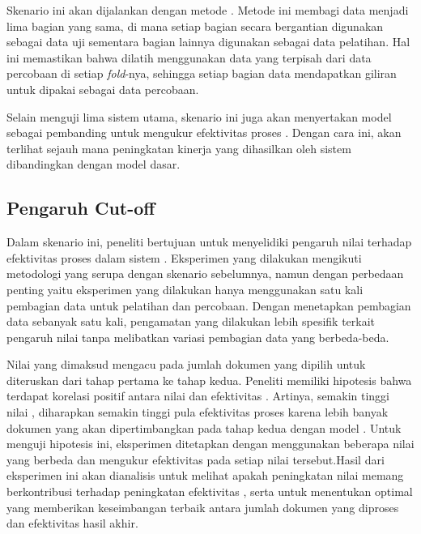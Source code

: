 Skenario ini akan dijalankan dengan metode \fcv{}. Metode ini membagi data menjadi lima bagian yang sama, di mana setiap bagian secara bergantian digunakan sebagai data uji sementara bagian lainnya digunakan sebagai data pelatihan. Hal ini memastikan bahwa \reranker{} dilatih menggunakan data yang terpisah dari data percobaan \retrieval{} di setiap \textit{fold}-nya, sehingga setiap bagian data mendapatkan giliran untuk dipakai sebagai data percobaan.

Selain menguji lima sistem utama, skenario ini juga akan menyertakan model \base{} \retriever{} sebagai pembanding untuk mengukur efektivitas proses \retrieval{}. Dengan cara ini, akan terlihat sejauh mana peningkatan kinerja yang dihasilkan oleh sistem \cascaded{} \ir{} dibandingkan dengan model dasar.





\subsection{Pengaruh Cut-off}
\label{subbab:5::Pengaruh Cut-off}
Dalam skenario ini, peneliti bertujuan untuk menyelidiki pengaruh nilai \cutoff{} terhadap efektivitas proses \retrieval{} dalam sistem \cascaded{} \ir{}. Eksperimen yang dilakukan mengikuti metodologi yang serupa dengan skenario sebelumnya, namun dengan perbedaan penting yaitu eksperimen yang dilakukan hanya menggunakan satu kali pembagian data untuk pelatihan dan percobaan. Dengan menetapkan pembagian data sebanyak satu kali, pengamatan yang dilakukan lebih spesifik terkait pengaruh nilai \cutoff{} tanpa melibatkan variasi pembagian data yang berbeda-beda.

Nilai \cutoff{} yang dimaksud mengacu pada jumlah dokumen yang dipilih untuk diteruskan dari tahap \ranking{} pertama ke tahap kedua. Peneliti memiliki hipotesis bahwa terdapat korelasi positif antara nilai \cutoff{} dan efektivitas \retrieval{}. Artinya, semakin tinggi nilai \cutoff{}, diharapkan semakin tinggi pula efektivitas proses \retrieval{} karena lebih banyak dokumen yang akan dipertimbangkan pada tahap \ranking{} kedua dengan model \lambdamart{}. Untuk menguji hipotesis ini, eksperimen ditetapkan dengan menggunakan beberapa nilai \cutoff{} yang berbeda dan mengukur efektivitas pada setiap nilai tersebut.Hasil dari eksperimen ini akan dianalisis untuk melihat apakah peningkatan nilai \cutoff{} memang berkontribusi terhadap peningkatan efektivitas \retrieval{}, serta untuk menentukan \cutoff{} optimal yang memberikan keseimbangan terbaik antara jumlah dokumen yang diproses dan efektivitas hasil akhir.





